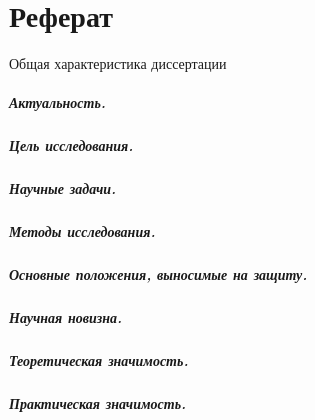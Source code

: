 \renewcommand{\figurename}{Рисунок}
\renewcommand{\tablename}{Таблица}
\renewcommand\thesubfigure{\asbuk{subfigure}}
\chapter*{Реферат}

\begin{center}
    Общая характеристика диссертации
\end{center}

\paragraph*{Актуальность.}

\paragraph*{Цель исследования.}
\paragraph*{Научные задачи.}

\paragraph*{Методы исследования.}

\paragraph*{Основные положения, выносимые на защиту.}

\paragraph*{Научная новизна.}

\paragraph*{Теоретическая значимость.}
\paragraph*{Практическая значимость.}
